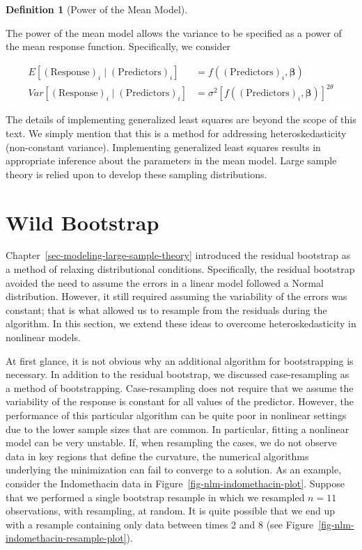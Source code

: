 \documentclass[
  letterpaper,
  DIV=11,
  numbers=noendperiod]{scrreprt}
\theoremstyle{definition}
\newtheorem{definition}{Definition}[chapter]
\theoremstyle{definition}
\theoremstyle{remark}
\begin{document}
\begin{definition}[Power of the Mean
Model]\protect\hypertarget{def-pom}{}\label{def-pom}

The power of the mean model allows the variance to be specified as a
power of the mean response function. Specifically, we consider

\[
\begin{aligned}
  E\left[(\text{Response})_i \mid (\text{Predictors})_i\right]
    &= f\left((\text{Predictors})_i, \boldsymbol{\beta}\right) \\
  Var\left[(\text{Response})_i \mid (\text{Predictors})_i\right]
    &= \sigma^2 \left[f\left((\text{Predictors})_i, \boldsymbol{\beta}\right)\right]^{2\theta}
\end{aligned}
\]

\end{definition}

The details of implementing generalized least squares are beyond the
scope of this text. We simply mention that this is a method for
addressing heteroskedasticity (non-constant variance). Implementing
generalized least squares results in appropriate inference about the
parameters in the mean model. Large sample theory is relied upon to
develop these sampling distributions.

\hypertarget{wild-bootstrap}{%
\section{Wild Bootstrap}\label{wild-bootstrap}}

Chapter~\ref{sec-modeling-large-sample-theory} introduced the residual
bootstrap as a method of relaxing distributional conditions.
Specifically, the residual bootstrap avoided the need to assume the
errors in a linear model followed a Normal distribution. However, it
still required assuming the variability of the errors was constant; that
is what allowed us to resample from the residuals during the algorithm.
In this section, we extend these ideas to overcome heteroskedasticity in
nonlinear models.

At first glance, it is not obvious why an additional algorithm for
bootstrapping is necessary. In addition to the residual bootstrap, we
discussed case-resampling as a method of bootstrapping. Case-resampling
does not require that we assume the variability of the response is
constant for all values of the predictor. However, the performance of
this particular algorithm can be quite poor in nonlinear settings due to
the lower sample sizes that are common. In particular, fitting a
nonlinear model can be very unstable. If, when resampling the cases, we
do not observe data in key regions that define the curvature, the
numerical algorithms underlying the minimization can fail to converge to
a solution. As an example, consider the Indomethacin data in
Figure~\ref{fig-nlm-indomethacin-plot}. Suppose that we performed a
single bootstrap resample in which we resampled \(n = 11\) observations,
with resampling, at random. It is quite possible that we end up with a
resample containing only data between times 2 and 8 (see
Figure~\ref{fig-nlm-indomethacin-resample-plot}).
\end{document}
